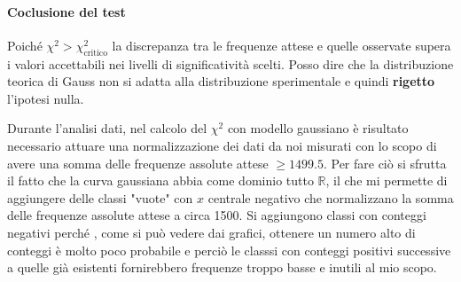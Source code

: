 \documentclass{article}
\begin{document}
\paragraph{Coclusione del test} Poiché $\chi^2 > \chi^2_{\text{critico}}$ la discrepanza tra le frequenze attese e quelle osservate supera i valori accettabili nei livelli di significatività scelti. Posso dire che la distribuzione teorica di Gauss non si adatta alla distribuzione sperimentale e quindi \textbf{rigetto} l'ipotesi nulla.



\begin{center}
\end{center}

\noindent
Durante l'analisi dati, nel calcolo del $\chi^2$ con modello gaussiano è risultato necessario attuare una normalizzazione dei dati da noi misurati con lo scopo di avere una somma delle frequenze assolute attese $\geq 1499.5$. Per fare ciò si sfrutta il fatto che la curva gaussiana abbia come dominio tutto $\mathbb{R}$, il che mi permette di aggiungere delle classi "vuote" con $x$ centrale negativo che normalizzano la somma delle frequenze assolute attese a circa 1500. Si aggiungono classi con conteggi negativi perché , come si può vedere dai grafici, ottenere un numero alto di conteggi è molto poco probabile e perciò le classsi con conteggi positivi successive a quelle già esistenti fornirebbero frequenze troppo basse e inutili al mio scopo.
\end{document}
